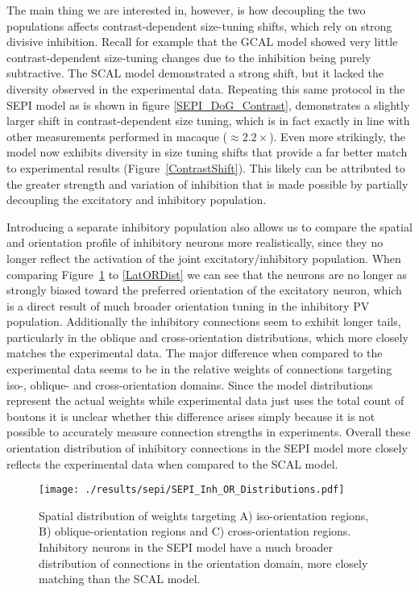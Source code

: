 The main thing we are interested in, however, is how decoupling the
two populations affects contrast-dependent size-tuning shifts, which
rely on strong divisive inhibition. Recall for example that the GCAL
model showed very little contrast-dependent size-tuning changes due to
the inhibition being purely subtractive. The SCAL model demonstrated a
strong shift, but it lacked the diversity observed in the experimental
data. Repeating this same protocol in the SEPI model as is shown in
figure \ref{SEPI_DoG_Contrast}, demonstrates a slightly larger shift
in contrast-dependent size tuning, which is in fact exactly in line
with other measurements performed in macaque ($\approx
2.2\times$). Even more strikingly, the model now exhibits diversity in
size tuning shifts that provide a far better match to experimental
results (Figure~\ref{ContrastShift}). This likely can be attributed to
the greater strength and variation of inhibition that is made possible
by partially decoupling the excitatory and inhibitory population.

Introducing a separate inhibitory population also allows us to compare
the spatial and orientation profile of inhibitory neurons more
realistically, since they no longer reflect the activation of the
joint excitatory/inhibitory population. When comparing
Figure~\ref{SEPI_OR_Distributions} to \ref{LatORDist} we can see that
the neurons are no longer as strongly biased toward the preferred
orientation of the excitatory neuron, which is a direct result of much
broader orientation tuning in the inhibitory PV
population. Additionally the inhibitory connections seem to exhibit
longer tails, particularly in the oblique and cross-orientation
distributions, which more closely matches the experimental data. The
major difference when compared to the experimental data seems to be in
the relative weights of connections targeting iso-, oblique- and
cross-orientation domains. Since the model distributions represent the
actual weights while experimental data just uses the total count of
boutons it is unclear whether this difference arises simply because it
is not possible to accurately measure connection strengths in
experiments. Overall these orientation distribution of inhibitory
connections in the SEPI model more closely reflects the experimental
data when compared to the SCAL model.

\begin{figure}
	\centering
    \texttt{[image: ./results/sepi/SEPI\_Inh\_OR\_Distributions.pdf]}
	\caption{Spatial distribution of weights targeting A)
      iso-orientation regions, B) oblique-orientation regions and C)
      cross-orientation regions. Inhibitory neurons in the SEPI model
      have a much broader distribution of connections in the
      orientation domain, more closely matching \cite{Kisvarday1997a}
      than the SCAL model.}
	\label{SEPI_OR_Distributions}
\end{figure}

